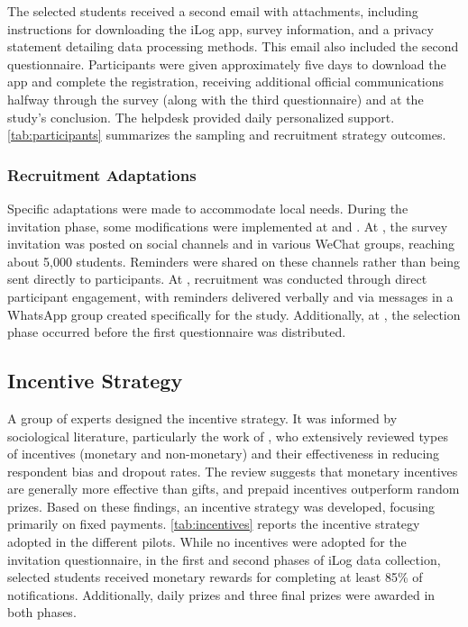 The selected students received a second email with attachments, including instructions for downloading the iLog app, survey information, and a privacy statement detailing data processing methods. This email also included the second questionnaire. Participants were given approximately five days to download the app and complete the registration, receiving additional official communications halfway through the survey (along with the third questionnaire) and at the study’s conclusion. The helpdesk provided daily personalized support. \cref{tab:participants} summarizes the sampling and recruitment strategy outcomes.

\subsubsection{Recruitment Adaptations}

Specific adaptations were made to accommodate local needs. During the invitation phase, some modifications were implemented at \JLU and \IPICYT. At \JLU, the survey invitation was posted on social channels and in various WeChat groups, reaching about 5,000 students. Reminders were shared on these channels rather than being sent directly to participants. At \IPICYT, recruitment was conducted through direct participant engagement, with reminders delivered verbally and via messages in a WhatsApp group created specifically for the study. Additionally, at \IPICYT, the selection phase occurred before the first questionnaire was distributed.


\subsection{Incentive Strategy}\label{sec:incentives}

A group of experts designed the incentive strategy. It was informed by sociological literature, particularly the work of \citet{singer2013use}, who extensively reviewed types of incentives (monetary and non-monetary) and their effectiveness in reducing respondent bias and dropout rates. The review suggests that monetary incentives are generally more effective than gifts, and prepaid incentives outperform random prizes. Based on these findings, an incentive strategy was developed, focusing primarily on fixed payments.
%
\cref{tab:incentives} reports the incentive strategy adopted in the different pilots. While no incentives were adopted for the invitation questionnaire, in the first and second phases of iLog data collection, selected students received monetary rewards for completing at least 85\% of notifications. Additionally, daily prizes and three final prizes were awarded in both phases. 

